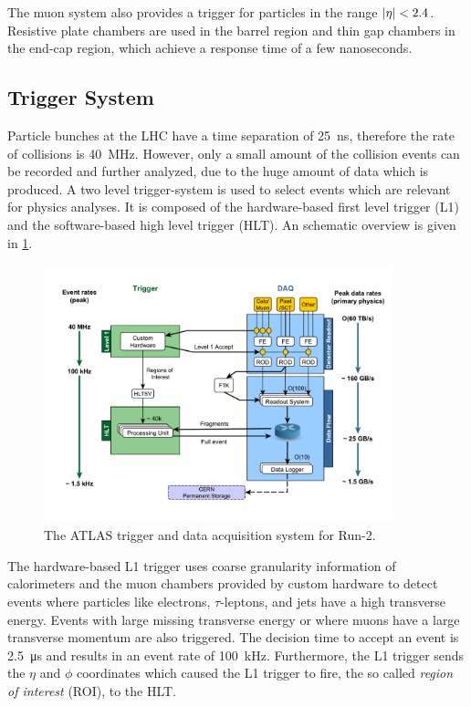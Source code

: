 The muon system also provides a trigger for particles in the range $\left|\eta\right| < 2.4$.
Resistive plate chambers are used in the barrel region and thin gap chambers in the end-cap region, which
achieve a response time of a few nanoseconds.

\subsection{Trigger System}\label{sub:setup:trigger}

Particle bunches at the LHC have a time separation of \SI{25}{\ns}, therefore the rate of collisions is \SI{40}{\MHz}.
However, only a small amount of the collision events can be recorded and further analyzed, due to the huge amount of data which is produced.
A two level trigger-system is used to select events which are relevant for physics analyses.
It is composed of the hardware-based first level trigger (L1) and the software-based high level trigger (HLT).
An schematic overview is given in \cref{fig:setup:trigger}.

\begin{figure}[htb]
    \centering
    \includegraphics[width=0.9\textwidth]{./figures/setup/trigger.pdf}
    \caption{The ATLAS trigger and data acquisition system for Run-2.\cite{ImageTrigger}}\label{fig:setup:trigger}
\end{figure}

The hardware-based L1 trigger uses coarse granularity information of calorimeters and the muon chambers provided by custom hardware
to detect events where particles like electrons, $\tau$-leptons, and jets have a high transverse energy.
Events with large missing transverse energy or where muons have a large transverse momentum are also triggered.
The decision time to accept an event is \SI{2.5}{\us} and results in an event rate of \SI{100}{\kHz}.
Furthermore, the L1 trigger sends the $\eta$ and $\phi$ coordinates which caused the L1 trigger to fire,
the so called \emph{region of interest} (ROI), to the HLT\@.

